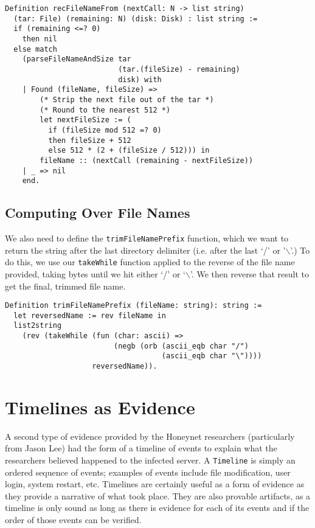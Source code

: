 \documentclass[nocopyrightspace]{sigplanconf}
\begin{document}
\begin{lstlisting}
Definition recFileNameFrom (nextCall: N -> list string) 
  (tar: File) (remaining: N) (disk: Disk) : list string :=
  if (remaining <=? 0)
    then nil
  else match 
    (parseFileNameAndSize tar 
                          (tar.(fileSize) - remaining) 
                          disk) with
    | Found (fileName, fileSize) =>
        (* Strip the next file out of the tar *)
        (* Round to the nearest 512 *)
        let nextFileSize := (
          if (fileSize mod 512 =? 0)
          then fileSize + 512
          else 512 * (2 + (fileSize / 512))) in
        fileName :: (nextCall (remaining - nextFileSize))
    | _ => nil
    end.
\end{lstlisting}

\subsection{Computing Over File Names}

We also need to define the {\tt trimFileNamePrefix} function, which we want to
return the string after the last directory delimiter (i.e. after the last `/'
or '$\backslash$'.) To do this, we use our {\tt takeWhile} function applied
to the reverse of the file name provided, taking bytes until we hit either `/'
or `$\backslash$'. We then reverse that result to get the final, trimmed file
name.

\begin{lstlisting}
Definition trimFileNamePrefix (fileName: string): string :=
  let reversedName := rev fileName in
  list2string
    (rev (takeWhile (fun (char: ascii) => 
                         (negb (orb (ascii_eqb char "/")
                                    (ascii_eqb char "\"))))
                    reversedName)).
\end{lstlisting}

\section{Timelines as Evidence}
\label{sec:timelines}

A second type of evidence provided by the Honeynet researchers (particularly
from Jason Lee\cite{lee}) had the form of a timeline of events to explain what
the researchers believed happened to the infected server. A {\tt Timeline} is
simply an ordered sequence of events; examples of events include file
modification, user login, system restart, etc. Timelines are certainly useful
as a form of evidence as they provide a narrative of what took place. They are
also provable artifacts, as a timeline is only sound as long as there is
evidence for each of its events and if the order of those events can be
verified. 
\end{document}
